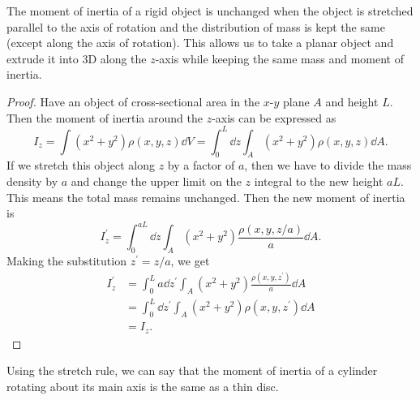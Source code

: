 \documentclass[../classical_mechanics.tex]{subfiles}
\begin{document}
            \begin{theorem}
                The moment of inertia of a rigid object is unchanged when the object is stretched parallel to the axis of rotation and the distribution of mass is kept the same (except along the axis of rotation).
                This allows us to take a planar object and extrude it into 3D along the $z$-axis while keeping the same mass and moment of inertia.
            \end{theorem}
            \begin{proof}
                Have an object of cross-sectional area in the $x$-$y$ plane $A$ and height $L$.
                Then the moment of inertia around the $z$-axis can be expressed as
                \begin{equation}
                    I_z=\int(x^2+y^2)\rho(x,y,z)\dd{V}=\int_0^L\dd{z}\int_A(x^2+y^2)\rho(x,y,z)\dd{A}.
                \end{equation}
                If we stretch this object along $z$ by a factor of $a$, then we have to divide the mass density by $a$ and change the upper limit on the $z$ integral to the new height $aL$.
                This means the total mass remains unchanged.
                Then the new moment of inertia is
                \begin{equation}
                    I_z^\prime=\int_0^{aL}\dd{z}\int_A(x^2+y^2)\frac{\rho(x,y,z/a)}{a}\dd{A}.
                \end{equation}
                Making the substitution $z^\prime=z/a$, we get
                \begin{align}
                    I_z^\prime&=\int_0^L a\dd{z}^\prime\int_A(x^2+y^2)\frac{\rho(x,y,z^\prime)}{a}\dd{A}\\
                    &=\int_0^L\dd{z}^\prime\int_A(x^2+y^2)\rho(x,y,z^\prime)\dd{A}\\
                    &=I_z.
                \end{align}
            \end{proof}
            Using the stretch rule, we can say that the moment of inertia of a cylinder rotating about its main axis is the same as a thin disc.
\end{document}
